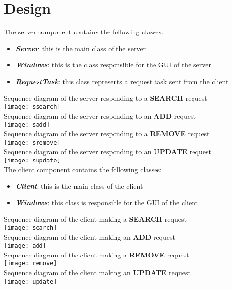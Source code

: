 \documentclass{article}
\begin{document}
\section*{Design}
The server component contains the following classes:
\begin{itemize}
    \item \textbf{\emph{Server}}: this is the main class of the server
    \item \textbf{\emph{Windows}}: this is the class responsible for the GUI of the server
    \item \textbf{\emph{RequestTask}}: this class represents a request task sent from the client
\end{itemize}

Sequence diagram of the server responding to a \textbf{SEARCH} request\\
\texttt{[image: ssearch]}\\
Sequence diagram of the server responding to an \textbf{ADD} request\\
\texttt{[image: sadd]}\\
Sequence diagram of the server responding to a \textbf{REMOVE} request\\
\texttt{[image: sremove]}\\
Sequence diagram of the server responding to an \textbf{UPDATE} request\\
\texttt{[image: supdate]}\\
The client component contains the following classes:
\begin{itemize}
    \item \textbf{\emph{Client}}: this is the main class of the client
    \item \textbf{\emph{Windows}}: this class is responsible for the GUI of the client
\end{itemize}
Sequence diagram of the client making a \textbf{SEARCH} request\\
\texttt{[image: search]}\\
Sequence diagram of the client making an \textbf{ADD} request\\
\texttt{[image: add]}\\
Sequence diagram of the client making a \textbf{REMOVE} request\\
\texttt{[image: remove]}\\
Sequence diagram of the client making an \textbf{UPDATE} request\\
\texttt{[image: update]}\\
\end{document}
